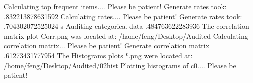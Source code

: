\documentclass[letterpaper,12pt,english]{sphinxmanual}
\begin{document}
\begin{sphinxVerbatim}[commandchars=\\\{\}]
Calculating top  frequent items.... Please be patient!
Generate rates took: .832213878631592 
Calculating rates.... Please be patient!
Generate rates took: .704302072525024 s
Auditing categorical data   .484763622283936 
The correlation matrix plot Corr.png was located at:
/home/feng/Desktop/Audited
Calculating correlation matrix... Please be patient!
Generate correlation matrix   .61273431777954 
The Histograms plots *.png were located at:
/home/feng/Desktop/Audited/02\PYGZhy{}hist
Plotting histograms of \PYGZus{}c0.... Please be patient!

\end{sphinxVerbatim}
\end{document}
